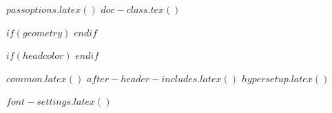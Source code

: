 %
%
%
%
%
$passoptions.latex()$
%
$doc-class.tex()$

$if(geometry)$
\geometry{$for(geometry)$$geometry$$sep$,$endfor$}
$endif$

$if(headcolor)$
$endif$

$common.latex()$
$after-header-includes.latex()$
$hypersetup.latex()$

$font-settings.latex()$

